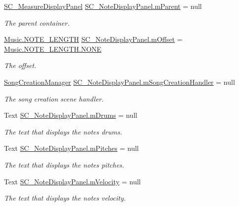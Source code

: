 \begin{DoxyCompactItemize}
\hyperlink{class_s_c___measure_display_panel}{S\+C\+\_\+\+Measure\+Display\+Panel} \hyperlink{group___s_c___n_d_p_priv_var_ga360017747d9ed8910ddd4b3309477710}{S\+C\+\_\+\+Note\+Display\+Panel.\+m\+Parent} = null
\begin{DoxyCompactList}\small\item\em The parent container. \end{DoxyCompactList}\item 
\hyperlink{group___music_enums_gaf11b5f079adbb21c800b9eca1c5c3cbd}{Music.\+N\+O\+T\+E\+\_\+\+L\+E\+N\+G\+TH} \hyperlink{group___s_c___n_d_p_priv_var_ga0a78a2c25da29d944d56d1c8ebb74d03}{S\+C\+\_\+\+Note\+Display\+Panel.\+m\+Offset} = \hyperlink{group___music_enums_ggaf11b5f079adbb21c800b9eca1c5c3cbdab50339a10e1de285ac99d4c3990b8693}{Music.\+N\+O\+T\+E\+\_\+\+L\+E\+N\+G\+T\+H.\+N\+O\+NE}
\begin{DoxyCompactList}\small\item\em The offset. \end{DoxyCompactList}\item 
\hyperlink{class_song_creation_manager}{Song\+Creation\+Manager} \hyperlink{group___s_c___n_d_p_priv_var_ga5e4ae5e7daa568c3e2b471c0835600c6}{S\+C\+\_\+\+Note\+Display\+Panel.\+m\+Song\+Creation\+Handler} = null
\begin{DoxyCompactList}\small\item\em The song creation scene handler. \end{DoxyCompactList}\item 
Text \hyperlink{group___s_c___n_d_p_priv_var_gadd38ff2acddedee4b6165f2fc48fd43c}{S\+C\+\_\+\+Note\+Display\+Panel.\+m\+Drums} = null
\begin{DoxyCompactList}\small\item\em The text that displays the note\textquotesingle{}s drums. \end{DoxyCompactList}\item 
Text \hyperlink{group___s_c___n_d_p_priv_var_ga8018aa4f7b333a7129badf082f233a3c}{S\+C\+\_\+\+Note\+Display\+Panel.\+m\+Pitches} = null
\begin{DoxyCompactList}\small\item\em The text that displays the note\textquotesingle{}s pitches. \end{DoxyCompactList}\item 
Text \hyperlink{group___s_c___n_d_p_priv_var_ga4924aa3f63f171ed33f5f85d11a760c4}{S\+C\+\_\+\+Note\+Display\+Panel.\+m\+Velocity} = null
\begin{DoxyCompactList}\small\item\em The text that displays the note\textquotesingle{}s velocity. \end{DoxyCompactList}\end{DoxyCompactItemize}


